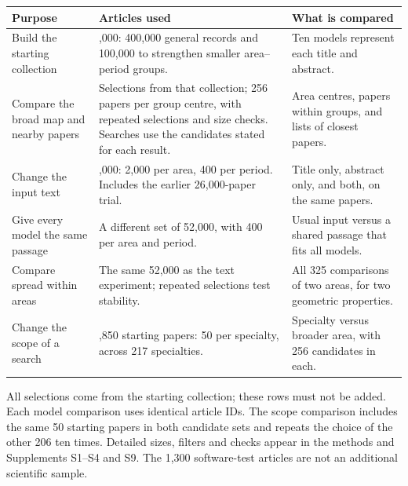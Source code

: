 \par\noindent\begin{minipage}{\linewidth}
\small
\setlength{\tabcolsep}{4pt}
\renewcommand{\arraystretch}{1.10}
\label{tab:T01}
\begin{tabular}{@{}>{\raggedright\arraybackslash}p{4.25cm}>{\raggedright\arraybackslash}p{6.1cm}>{\raggedright\arraybackslash}p{4.8cm}@{}}
\toprule
\textbf{Purpose} & \textbf{Articles used} & \textbf{What is compared} \\
\midrule
Build the starting collection & 500,000: 400,000 general records and 100,000 to strengthen smaller area--period groups. & Ten models represent each title and abstract. \\
\addlinespace[8pt]
Compare the broad map and nearby papers & Selections from that collection; 256 papers per group centre, with repeated selections and size checks. Searches use the candidates stated for each result. & Area centres, papers within groups, and lists of closest papers. \\
\addlinespace[8pt]
Change the input text & 52,000: 2,000 per area, 400 per period. Includes the earlier 26,000-paper trial. & Title only, abstract only, and both, on the same papers. \\
\addlinespace[8pt]
Give every model the same passage & A different set of 52,000, with 400 per area and period. & Usual input versus a shared passage that fits all models. \\
\addlinespace[8pt]
Compare spread within areas & The same 52,000 as the text experiment; repeated selections test stability. & All 325 comparisons of two areas, for two geometric properties. \\
\addlinespace[8pt]
Change the scope of a search & 10,850 starting papers: 50 per specialty, across 217 specialties. & Specialty versus broader area, with 256 candidates in each. \\
\bottomrule
\end{tabular}
\par\smallskip
All selections come from the starting collection; these rows must not be added. Each model comparison uses identical article IDs. The scope comparison includes the same 50 starting papers in both candidate sets and repeats the choice of the other 206 ten times. Detailed sizes, filters and checks appear in the methods and Supplements S1--S4 and S9. The 1,300 software-test articles are not an additional scientific sample.
\end{minipage}\par
